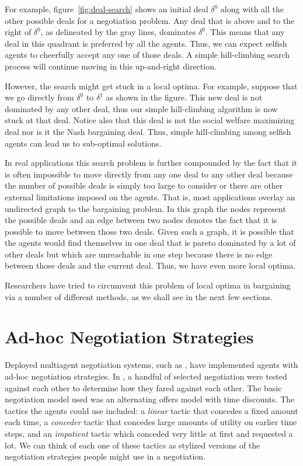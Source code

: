 For example, figure~\ref{fig:deal-search} shows an initial deal
$\delta^0$ along with all the other possible deals for a negotiation
problem. Any deal that is above and to the right of $\delta^0$, as
delineated by the gray lines, dominates $\delta^0$. This means that
any deal in this quadrant is preferred by all the agents. Thus, we can
expect selfish agents to cheerfully accept any one of those deals. A
simple hill-climbing search process will continue moving in this
up-and-right direction.

However, the search might get stuck in a local optima. For example,
suppose that we go directly from $\delta^0$ to $\delta^1$ as shown in
the figure. This new deal is not dominated by any other deal, thus our
simple hill-climbing algorithm is now stuck at that deal. Notice also
that this deal is not the social welfare maximizing deal nor is it the
Nash bargaining deal. Thus, simple hill-climbing among selfish agents
can lead us to sub-optimal solutions.

In real applications this search problem is further compounded by the
fact that it is often impossible to move directly from any one deal to
any other deal because the number of possible deals is simply too
large to consider or there are other external limitations imposed on
the agents.  That is, most applications overlay an undirected graph to
the bargaining problem. In this graph the nodes represent the possible
deals and an edge between two nodes denotes the fact that it is
possible to move between those two deals. Given such a graph, it is
possible that the agents would find themselves in one deal that is
pareto dominated by a lot of other deals but which are unreachable in
one step because there is no edge between those deals and the current
deal. Thus, we have even more local optima.

Researchers have tried to circumvent this problem of local optima in
bargaining via a number of different methods, as we shall see in the
next few sections.

\section{Ad-hoc Negotiation Strategies}
\label{sec:ad-hoc-negotiation}

Deployed multiagent negotiation systems, such as 
\cite{faratin98a,binmore99a}, have implemented agents with ad-hoc
negotiation strategies. In , a handful of selected
negotiation  were tested against each other to determine
how they fared against each other. The basic negotiation model used
was an alternating offers model with time discounts. The tactics the
agents could use included: a \emph{linear} tactic that concedes a
fixed amount each time, a \emph{conceder} tactic that concedes large
amounts of utility on earlier time steps, and an \emph{impatient}
tactic which conceded very little at first and requested a lot. We can
think of each one of these tactics as stylized versions of the
negotiation strategies people might use in a negotiation.

